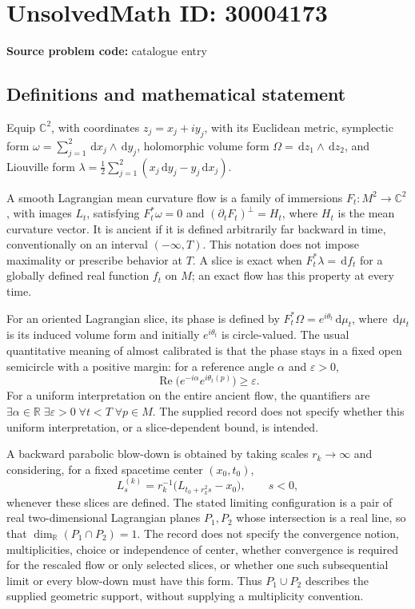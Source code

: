 \documentclass[11pt]{article}
\newcommand{\R}{\mathbb{R}}
\newcommand{\C}{\mathbb{C}}
\newcommand{\dd}{\,\mathrm{d}}
\begin{document}
\section*{UnsolvedMath ID: 30004173}
\textbf{Source problem code:} catalogue entry
\subsection{Definitions and mathematical statement}
Equip \(\C^2\), with coordinates \(z_j=x_j+iy_j\), with its Euclidean metric, symplectic form \(\omega=\sum_{j=1}^2\dd x_j\wedge\dd y_j\), holomorphic volume form \(\Omega=\dd z_1\wedge\dd z_2\), and Liouville form \(\lambda=\tfrac12\sum_{j=1}^2(x_j\dd y_j-y_j\dd x_j)\).

A smooth Lagrangian mean curvature flow is a family of immersions \(F_t:M^2\to\C^2\), with images \(L_t\), satisfying \(F_t^*\omega=0\) and \((\partial_tF_t)^\perp=H_t\), where \(H_t\) is the mean curvature vector. It is ancient if it is defined arbitrarily far backward in time, conventionally on an interval \(( -\infty,T)\). This notation does not impose maximality or prescribe behavior at \(T\). A slice is exact when \(F_t^*\lambda=\dd f_t\) for a globally defined real function \(f_t\) on \(M\); an exact flow has this property at every time.

For an oriented Lagrangian slice, its phase is defined by \(F_t^*\Omega=e^{i\theta_t}\dd\mu_t\), where \(\dd\mu_t\) is its induced volume form and initially \(e^{i\theta_t}\) is circle-valued. The usual quantitative meaning of almost calibrated is that the phase stays in a fixed open semicircle with a positive margin: for a reference angle \(\alpha\) and \(\varepsilon>0\),
\[
\operatorname{Re}\bigl(e^{-i\alpha}e^{i\theta_t(p)}\bigr)\geq\varepsilon.
\]
For a uniform interpretation on the entire ancient flow, the quantifiers are \(\exists\alpha\in\R\;\exists\varepsilon>0\;\forall t<T\;\forall p\in M\). The supplied record does not specify whether this uniform interpretation, or a slice-dependent bound, is intended.

A backward parabolic blow-down is obtained by taking scales \(r_k\to\infty\) and considering, for a fixed spacetime center \((x_0,t_0)\),
\[
L_s^{(k)}=r_k^{-1}\bigl(L_{t_0+r_k^2s}-x_0\bigr),\qquad s<0,
\]
whenever these slices are defined. The stated limiting configuration is a pair of real two-dimensional Lagrangian planes \(P_1,P_2\) whose intersection is a real line, so that \(\dim_{\R}(P_1\cap P_2)=1\). The record does not specify the convergence notion, multiplicities, choice or independence of center, whether convergence is required for the rescaled flow or only selected slices, or whether one such subsequential limit or every blow-down must have this form. Thus \(P_1\cup P_2\) describes the supplied geometric support, without supplying a multiplicity convention.
\end{document}
